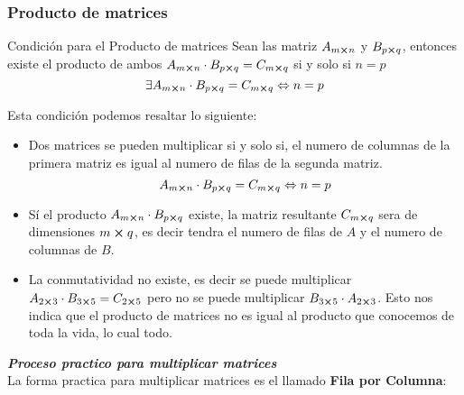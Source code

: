 \subsubsection{Producto de matrices}
\begin{Theorem*} {Condición para el Producto de matrices}
	Sean las matriz $A_{m\cross n}$ y $B_{p\cross q}$, entonces existe el producto de ambos $A_{m\cross n} \cdot B_{p\cross q}=C_{m\cross q}$ si y solo si $n=p$
	$$ \exists  A_{m\cross n} \cdot B_{p\cross q}=C_{m\cross q} \Leftrightarrow n=p $$
\end{Theorem*}
Esta condición podemos resaltar lo siguiente:
\begin{itemize}
	\item Dos matrices se pueden multiplicar si y solo si, el numero de columnas de la primera matriz es igual al numero de filas de la segunda matriz. $$ A_{m\cross n} \cdot B_{p\cross q}=C_{m\cross q} \Leftrightarrow n=p  $$
	\item Sí el producto $A_{m\cross n} \cdot B_{p\cross q}$ existe, la matriz resultante $C_{m\cross q}$ sera de dimensiones $m\cross q$, es decir tendra el numero de filas de $A$ y el numero de columnas de $B$.
	\item La conmutatividad no existe, es decir se puede multiplicar $A_{2\cross 3} \cdot B_{3\cross 5}=C_{2\cross 5}$ pero no se puede multiplicar $B_{3\cross 5} \cdot A_{2\cross 3}$. Esto nos indica que el producto de matrices no es igual al producto que conocemos de toda la vida, lo cual todo.
\end{itemize}
\textbf{\textit{Proceso practico para multiplicar matrices}} \\
La forma practica para multiplicar matrices es el llamado \textbf{Fila por Columna}:
